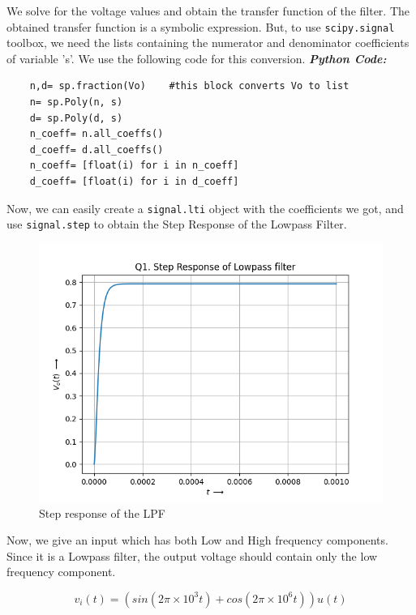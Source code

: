 \documentclass[11pt, a4paper]{article}
\begin{document}
    We solve for the voltage values and obtain the transfer function of the filter.\newline
    The obtained transfer function is a symbolic expression. But, to use
    \texttt{scipy.signal} toolbox, we need the lists containing the numerator and denominator coefficients of variable 's'. We use the following code for this conversion. 
 \textit{\textbf{Python Code:}}
    \lstset{language=Python}
    \lstset{basicstyle=\footnotesize}
    \begin{lstlisting}
    n,d= sp.fraction(Vo)    #this block converts Vo to list 
    n= sp.Poly(n, s)
    d= sp.Poly(d, s)
    n_coeff= n.all_coeffs() 
    d_coeff= d.all_coeffs()
    n_coeff= [float(i) for i in n_coeff]
    d_coeff= [float(i) for i in d_coeff]
    \end{lstlisting}
    Now, we can easily create a \texttt{signal.lti} object with the coefficients we got, and use \texttt{signal.step} to obtain the Step Response of the Lowpass Filter.
    \begin{figure}[H]
        \centering
        \includegraphics[scale=0.6]{Figure_1.png}
        \caption{Step response of the LPF}
        \label{fig:Fig2}
    \end{figure}
    Now, we give an input which has both Low and High frequency components. Since it is a Lowpass filter, the output voltage should contain only the low frequency component.

    \begin{equation}
        v_i(t) = (sin(2\pi\times 10^3t)+cos(2\pi\times 10^6t))u(t)
        \label{eq4}
    \end{equation}
    
\end{document}
